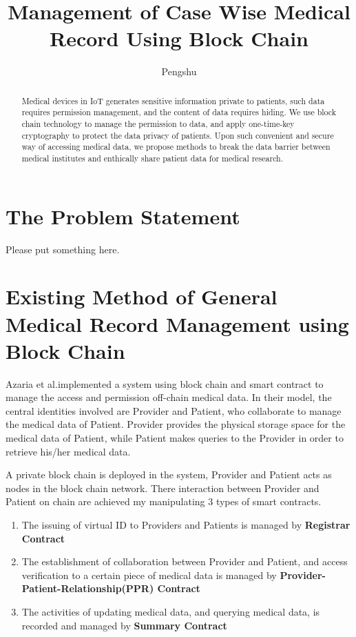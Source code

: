\documentclass[]{scrartcl}
\title{Management of Case Wise Medical Record Using Block Chain}
\author{Pengshu}
\begin{document}
\maketitle

\begin{abstract}
Medical devices in IoT generates sensitive information private to patients, such data requires permission management, and the content of data requires hiding. We use block chain technology to manage the permission to data, and apply one-time-key cryptography to protect the data privacy of patients. Upon such convenient and secure way of accessing medical data, we propose methods to break the data barrier between medical institutes and enthically share patient data for medical research.
\end{abstract}

\section{The Problem Statement}
Please put something here.

\section{Existing Method of General Medical Record Management using Block Chain}
Azaria et al.\cite{MedRecWhitePaper}implemented a system using block chain and smart contract to manage the access and permission off-chain medical data. In their model, the central identities involved are Provider and Patient, who collaborate to manage the medical data of Patient. Provider provides the physical storage space for the medical data of Patient, while Patient makes queries to the Provider in order to retrieve his/her medical data. 

A private block chain is deployed in the system, Provider and Patient acts as nodes in the block chain network. There interaction between Provider and Patient on chain are achieved my manipulating 3 types of smart contracts. 

\begin{enumerate}
\item The issuing of virtual ID to Providers and Patients is managed by \textbf{Registrar Contract}

\item The establishment of collaboration between Provider and Patient, and access verification to a certain piece of medical data is managed by \textbf{Provider-Patient-Relationship(PPR) Contract}

\item The activities of updating medical data, and querying medical data, is recorded and managed by \textbf{Summary Contract}
\end{enumerate}
\end{document}
